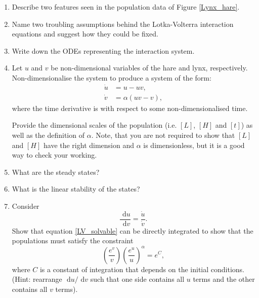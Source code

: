 \documentclass[]{article}
\newcommand{\bb}{\begin{equation}}
\newcommand{\ee}{\end{equation}}
\newcommand{\rd}{\text{ d}}
\newcommand{\fig}[1]{Figure \ref{#1}}
\newcommand{\eqn}[1]{equation \eqref{#1}}
\renewcommand{\l}{\left(}
\renewcommand{\r}{\right)}
\begin{document}
\begin{enumerate}
\item Describe two features seen in the population data of \fig{Lynx_hare}.
\item Name two troubling assumptions behind the Lotka-Volterra interaction equations and suggest how they could be fixed.
\item Write down the ODEs representing the interaction system.
\item Let $u$ and $v$ be non-dimensional variables of the hare and lynx, respectively. Non-dimensionalise the system to produce a system of the form:
\begin{align}
\dot{u}&=u-uv,\label{LV1}\\
\dot{v}&=\alpha(uv-v)\label{LV2},
\end{align}
where the time derivative is with respect to some non-dimensionalised time.

Provide the dimensional scales of the population (i.e. $[L]$, $[H]$ and $[t]$) as well as the definition of $\alpha$. Note, that you are not required to show that $[L]$ and $[H]$ have the right dimension and $\alpha$ is dimensionless, but it is a good way to check your working.
\item What are the steady states?
\item What is the linear stability of the states?
\item Consider
\bb
\frac{\rd u}{\rd v}=\frac{\dot{u}}{\dot{v}}.\label{LV_solvable}
\ee
Show that \eqn{LV_solvable} can be directly integrated to show that the populations must satisfy the constraint
\bb
\l\frac{e^{v}}{v}\r\l\frac{e^{u}}{u}\r^\alpha=e^{C},\label{LV_conserved}
\ee
where $C$ is a constant of integration that depends on the initial conditions. (Hint: rearrange $\rd u/\rd v$ such that one side contains all $u$ terms and the other contains all $v$ terms).
\end{enumerate}
\end{document}
